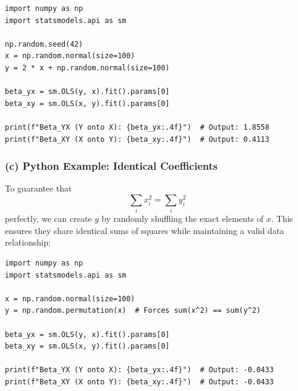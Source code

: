 \documentclass[12pt,a4paper]{article}
\begin{document}
\begin{lstlisting}
import numpy as np
import statsmodels.api as sm

np.random.seed(42)
x = np.random.normal(size=100)
y = 2 * x + np.random.normal(size=100)

beta_yx = sm.OLS(y, x).fit().params[0]
beta_xy = sm.OLS(x, y).fit().params[0]

print(f"Beta_YX (Y onto X): {beta_yx:.4f}")  # Output: 1.8558
print(f"Beta_XY (X onto Y): {beta_xy:.4f}")  # Output: 0.4113
\end{lstlisting}

\subsubsection*{(c) Python Example: Identical Coefficients}

To guarantee that
\[
\sum_i x_i^2=\sum_i y_i^2
\]
perfectly, we can create $y$ by randomly shuffling the exact elements of $x$. This ensures they share identical sums of squares while maintaining a valid data relationship:

\begin{lstlisting}
import numpy as np
import statsmodels.api as sm

x = np.random.normal(size=100)
y = np.random.permutation(x)  # Forces sum(x^2) == sum(y^2)

beta_yx = sm.OLS(y, x).fit().params[0]
beta_xy = sm.OLS(x, y).fit().params[0]

print(f"Beta_YX (Y onto X): {beta_yx:.4f}")  # Output: -0.0433
print(f"Beta_XY (X onto Y): {beta_xy:.4f}")  # Output: -0.0433
\end{lstlisting}
\end{document}
